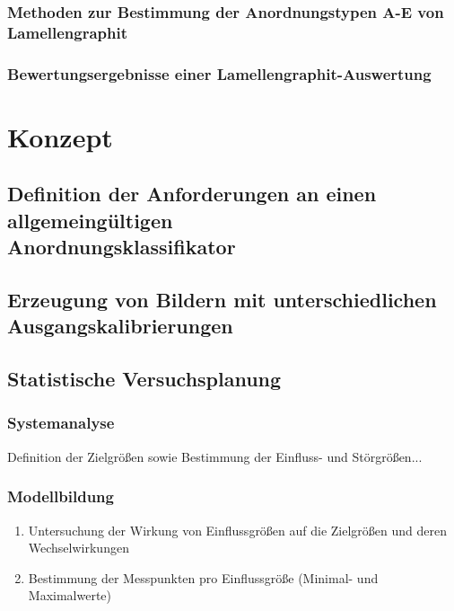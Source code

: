 \documentclass[
fontsize=10pt, 
listof = totoc,
parskip = half	
]{report}
\begin{document}
\subsection{Methoden zur Bestimmung der Anordnungstypen A-E von Lamellengraphit}
\label{subsec:AnordnungstypenLamellengraphit}

\subsection{Bewertungsergebnisse einer Lamellengraphit-Auswertung}

\label{subsec:ErgebnisseAMGuss}




\chapter{Konzept}
\label{ch:Konzept}

\section{Definition der Anforderungen an einen allgemeingültigen\\ Anordnungsklassifikator}

\section{Erzeugung von Bildern mit unterschiedlichen Ausgangskalibrierungen}


\section{Statistische Versuchsplanung}

\subsection{Systemanalyse}
Definition der Zielgrößen sowie Bestimmung der Einfluss- und Störgrößen...

\subsection{Modellbildung}
\begin{enumerate}
	\item Untersuchung der Wirkung von Einflussgrößen auf die Zielgrößen und deren Wechselwirkungen
	\item Bestimmung der Messpunkten pro Einflussgröße (Minimal- und Maximalwerte)
\end{enumerate}
\end{document}

